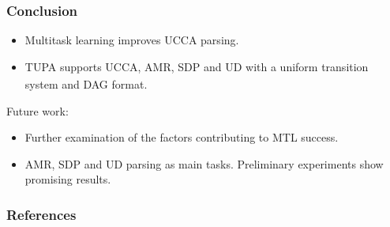 \documentclass[t,xcolor={svgnames}]{beamer}
\newcommand{\parser}[1]{TUPA\textsubscript{#1}}
\begin{document}
\begin{frame}
\frametitle{Conclusion}
\begin{itemize}
 \item Multitask learning improves UCCA parsing.
 \item \parser{} supports UCCA, AMR, SDP and UD with a uniform transition system and DAG format.
\end{itemize}

Future work:
\begin{itemize}
 \item Further examination of the factors contributing to MTL success.
 \item AMR, SDP and UD parsing as main tasks. Preliminary experiments show promising results.
\end{itemize}

\end{frame}



\begin{frame}[allowframebreaks]
\frametitle{References}

\tiny
\end{frame}
\end{document}

